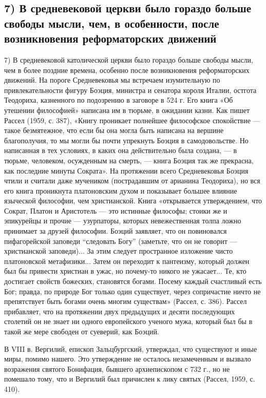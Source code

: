 \subsection{7) В средневековой церкви было гораздо больше свободы
мысли, чем, в особенности, после возникновения реформаторских
движений}

7) В средневековой католической церкви было гораздо больше свободы
мысли, чем в более поздние времена, особенно после возникновения
реформаторских движений. На пороге Средневековья мы встречаем
изумительную по привлекательности фигуру Боэция, министра и сенатора
короля Италии, остгота Теодориха, казненного по подозрению в заговоре
в 524 г. Его книга «Об утешении философией» написана им в тюрьме, в
ожидании казни. Как пишет Рассел (1959, с. 387), «Книгу проникает
полнейшее философское спокойствие --- такое безмятежное, что если бы
она могла быть написана на вершине благополучия, то мы могли бы почти
упрекнуть Боэция в самодовольстве. Но написанная в тех условиях, в
каких она действительно была создана, --- в тюрьме, человеком,
осужденным на смерть, --- книга Боэция так же прекрасна, как последние
минуты Сократа». На протяжении всего Средневековья Боэция чтили и
считали даже мучеником (пострадавшим от арианина Теодориха), но вся
его книга проникнута платоновским духом и показывает большее влияние
языческой философии, чем христианской. Книга «открывается
утверждением, что Сократ, Платон и Аристотель --- это истинные
философы; стоики же и эпикурейцы и прочие --- узурпаторы, которых
невежественная толпа ложно принимает за друзей философии. Боэций
заявляет, что он повиновался пифагорейской заповеди ``следовать Богу''
(заметьте, что он не говорит --- христианской заповеди)... За этим
следует пространное изложение чисто платоновской метафизики... Затем
он переходит к пантеизму, который должен был бы привести христиан в
ужас, но почему-то никого не ужасает... Те, кто достигает свойств
божеских, становятся богами. Посему каждый счастливый есть Бог;
правда, по природе Бог только один существует, через сопричастие ничто
не препятствует быть богами очень многим существам» (Рассел, с. 386).
Рассел прибавляет, что на протяжении двух предыдущих и десяти
последующих столетий он не знает ни одного европейского ученого мужа,
который был бы в такой же мере свободен от суеверий, как Боэций.

В VIII в. Вергилий, епископ Зальцбургский, утверждал, что существуют и
иные миры, помимо нашего. Это утверждение не осталось незамеченным и
вызвало возражения святого Бонифация, бывшего архиепископом с 732 г.,
но не помешало тому, что и Вергилий был причислен к лику святых
(Рассел, 1959, с. 410).

